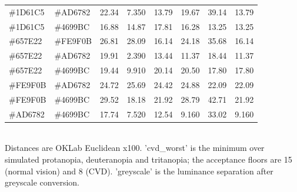 \begin{table}[!t]
\begin{tabular}{llrrrrrr}
\#1D61C5 & \#AD6782 & 22.34 & 7.350 & 13.79 & 19.67 & 39.14 & 13.79 \\
\#1D61C5 & \#4699BC & 16.88 & 14.87 & 17.81 & 16.28 & 13.25 & 13.25 \\
\#657E22 & \#FE9F0B & 26.81 & 28.09 & 16.14 & 24.18 & 35.68 & 16.14 \\
\#657E22 & \#AD6782 & 19.91 & 2.390 & 13.44 & 11.37 & 18.44 & 11.37 \\
\#657E22 & \#4699BC & 19.44 & 9.910 & 20.14 & 20.50 & 17.80 & 17.80 \\
\#FE9F0B & \#AD6782 & 24.72 & 25.69 & 24.42 & 24.88 & 22.09 & 22.09 \\
\#FE9F0B & \#4699BC & 29.52 & 18.18 & 21.92 & 28.79 & 42.71 & 21.92 \\
\#AD6782 & \#4699BC & 17.74 & 7.520 & 12.54 & 9.160 & 33.02 & 9.160 \\
\bottomrule
\end{tabular}
\\[2pt] \footnotesize Distances are OKLab Euclidean x100. 'cvd\_worst' is the minimum over simulated protanopia, deuteranopia and tritanopia; the acceptance floors are 15 (normal vision) and 8 (CVD). 'greyscale' is the luminance separation after greyscale conversion.
\end{table}

